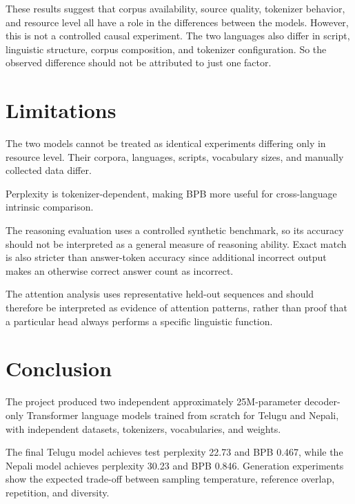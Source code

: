 \documentclass[10pt,a4paper]{article}
\begin{document}
These results suggest that corpus availability, source quality,
tokenizer behavior, and resource level all have a role in the
differences between the models. However, this is not a controlled
causal experiment. The two languages also differ in script,
linguistic structure, corpus composition, and tokenizer configuration.
So the observed difference should not be attributed to just one
factor.


\section{Limitations}


The two models cannot be treated as identical experiments differing
only in resource level. Their corpora, languages, scripts, vocabulary
sizes, and manually collected data differ.

Perplexity is tokenizer-dependent, making BPB more useful for
cross-language intrinsic comparison.

The reasoning evaluation uses a controlled synthetic benchmark, so its
accuracy should not be interpreted as a general measure of reasoning
ability. Exact match is also stricter than answer-token accuracy since
additional incorrect output makes an otherwise correct answer count as
incorrect.

The attention analysis uses representative held-out sequences and
should therefore be interpreted as evidence of attention patterns,
rather than proof that a particular head always performs a specific
linguistic function.


\section{Conclusion}


The project produced two independent approximately 25M-parameter
decoder-only Transformer language models trained from scratch for
Telugu and Nepali, with independent datasets, tokenizers, vocabularies,
and weights.

The final Telugu model achieves test perplexity 22.73 and BPB 0.467,
while the Nepali model achieves perplexity 30.23 and BPB 0.846.
Generation experiments show the expected trade-off between sampling
temperature, reference overlap, repetition, and diversity.
\end{document}
